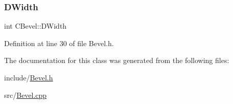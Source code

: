 \subsubsection{\texorpdfstring{D\+Width}{DWidth}}
{\footnotesize\ttfamily int C\+Bevel\+::\+D\+Width\hspace{0.3cm}{\ttfamily [protected]}}



Definition at line 30 of file Bevel.\+h.



The documentation for this class was generated from the following files\+:\begin{DoxyCompactItemize}
\item 
include/\hyperlink{Bevel_8h}{Bevel.\+h}\item 
src/\hyperlink{Bevel_8cpp}{Bevel.\+cpp}\end{DoxyCompactItemize}
